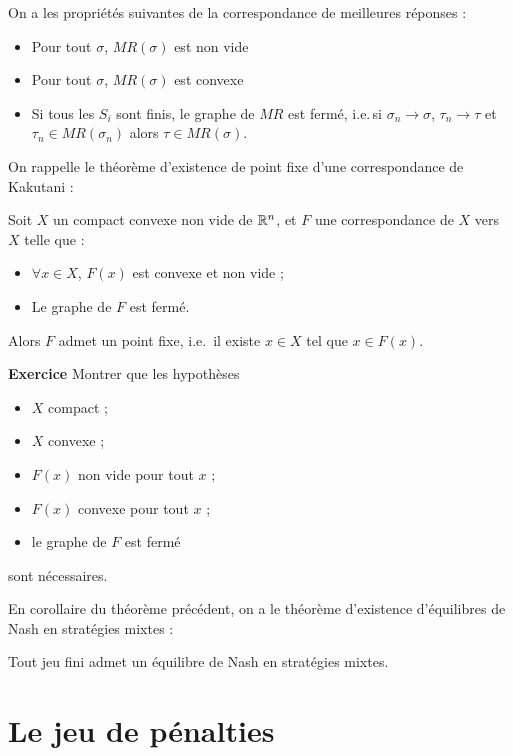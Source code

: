On a les propriétés suivantes de la correspondance de meilleures
réponses :

\begin{proposition}
\begin{itemize}
\item Pour tout $\sigma$, $MR(\sigma)$ est non vide%
\item Pour tout $\sigma$, $MR(\sigma)$ est convexe%
\item Si tous les $S_i$ sont finis, le graphe de $MR$ est fermé,
i.e.\,si $\sigma_n\to \sigma$, $\tau_n\to \tau$ et $\tau_n\in
MR(\sigma_n)$ alors $\tau\in MR(\sigma)$.%
\end{itemize}
\end{proposition}

On rappelle le théorème d'existence de point fixe d'une
correspondance de Kakutani :
\begin{theoreme}[de Kakutani] Soit $X$
un compact convexe non vide de $\mathbb R^n$, et $F$ une
correspondance de $X$ vers $X$ telle que :
\begin{itemize}
\item $\forall x\in X$, $F(x)$ est convexe et non vide ; \item Le
graphe de $F$ est ferm\'e.
\end{itemize}
Alors $F$ admet un point fixe, i.e.\, il existe $x\in X$ tel que
$x\in F(x)$. %
\end{theoreme}

{\bf Exercice} Montrer que les hypothèses
\begin{itemize}
\item $X$ compact ;%
\item $X$ convexe ; \item $F(x)$ non vide pour
tout $x$ ;%
\item $F(x)$ convexe pour tout $x$ ;%
\item le graphe de $F$ est ferm\'e
\end{itemize}
sont nécessaires.

En corollaire du théorème précédent, on a le théorème d'existence
d'équilibres de Nash en stratégies mixtes :


\begin{theoreme} Tout jeu fini admet un
équilibre de Nash en stratégies mixtes.
\end{theoreme}

\section{Le jeu de p\'enalties}

